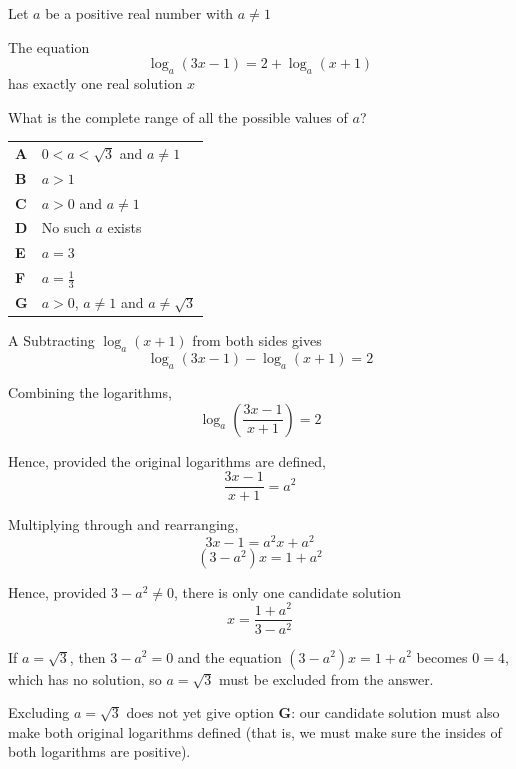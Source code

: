 \documentclass[11pt,a4paper]{article}
\begin{document}
\begin{enumerate}[label=\textbf{\arabic*.},leftmargin=*,itemsep=0pt,start=4]
Let $a$ be a positive real number with $a \ne 1$

The equation \[ \log_a(3x-1) = 2 + \log_a(x+1) \] has exactly one real solution $x$

What is the complete range of all the possible values of $a$?

\par\vspace*{12pt}
\begin{tabularx}{\linewidth}{@{}>{\bfseries}l Y@{}}
A &
$0<a<\sqrt{3}$ and $a\ne 1$
\\[0.8em]
B &
$a > 1$
\\[0.8em]
C &
$a>0$ and $a \ne 1$
\\[0.8em]
D &
No such $a$ exists
\\[0.8em]
E &
$a=3$
\\[0.8em]
F &
$a=\frac{1}{3}$
\\[0.8em]
G &
$a>0$, $a \ne 1$ and $a \ne \sqrt{3}$
\\
\end{tabularx}

\begin{djsSolution}{A}
Subtracting $\log_a(x+1)$ from both sides gives
\[
\log_a(3x-1)-\log_a(x+1)=2
\]

Combining the logarithms,
\[
\log_a\left(\frac{3x-1}{x+1}\right)=2
\]

Hence, provided the original logarithms are defined,
\[
\frac{3x-1}{x+1}=a^2
\]

Multiplying through and rearranging,
\[
3x-1=a^2x+a^2
\]
\[
(3-a^2)x=1+a^2
\]

Hence, provided $3-a^2\ne0$, there is only one candidate solution
\[
x=\frac{1+a^2}{3-a^2}
\]

If $a=\sqrt{3}$, then $3-a^2=0$ and the equation $(3-a^2)x=1+a^2$ becomes $0=4$, which has no solution, so $a=\sqrt{3}$ must be excluded from the answer.

Excluding $a=\sqrt3$ does not yet give option \textbf{G}: our candidate solution must also make both original logarithms defined (that is, we must make sure the insides of both logarithms are positive).


\end{djsSolution}
\end{enumerate}
\end{document}
